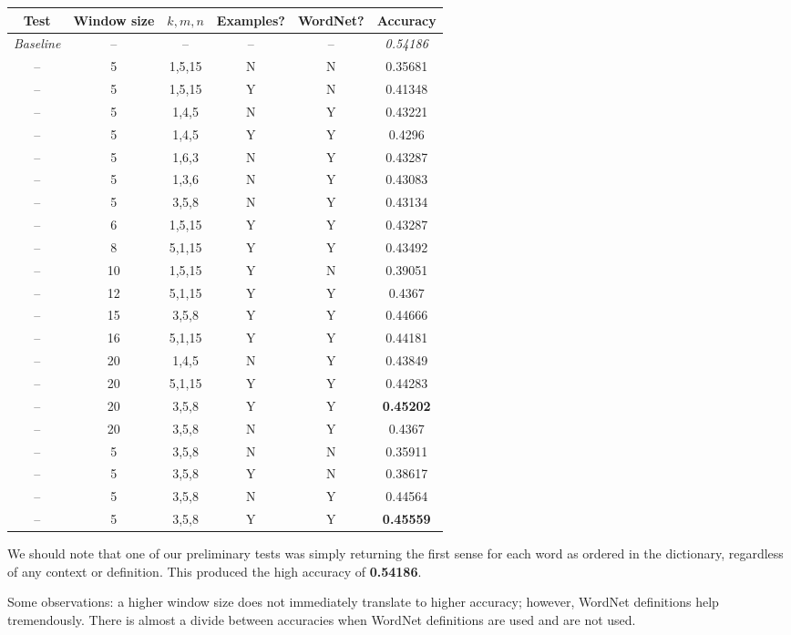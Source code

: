\documentclass{article}
\begin{document}
{\footnotesize\begin{tabular}{|c|c|c|c|c|c|}\hline
Test & Window size & $k,m,n$ & Examples? & WordNet? & Accuracy\\\hline
\textit{Baseline} & -- & -- & -- & -- & \textit{0.54186}\\
-- & 5 & 1,5,15 & N & N & 0.35681\\
-- & 5 & 1,5,15 & Y & N & 0.41348\\
-- & 5 & 1,4,5  & N & Y & 0.43221\\
-- & 5 & 1,4,5  & Y & Y & 0.4296\\
-- & 5 & 1,6,3  & N & Y & 0.43287\\
-- & 5 & 1,3,6  & N & Y & 0.43083\\
-- & 5 & 3,5,8  & N & Y & 0.43134\\
-- & 6 & 1,5,15 & Y & Y & 0.43287\\
-- & 8 & 5,1,15 & Y & Y & 0.43492\\
-- & 10 & 1,5,15 & Y & N & 0.39051\\
-- & 12 & 5,1,15 & Y & Y & 0.4367\\
-- & 15 & 3,5,8  & Y & Y & 0.44666\\
-- & 16 & 5,1,15 & Y & Y & 0.44181\\
-- & 20 & 1,4,5 & N & Y & 0.43849\\
-- & 20 & 5,1,15 & Y & Y & 0.44283\\
-- & 20 & 3,5,8  & Y & Y & \textbf{0.45202}\\
-- & 20 & 3,5,8  & N & Y & 0.4367\\\hline
-- & 5 & 3,5,8 & N & N & 0.35911\\
-- & 5 & 3,5,8 & Y & N & 0.38617\\
-- & 5 & 3,5,8 & N & Y & 0.44564\\
-- & 5 & 3,5,8 & Y & Y & \textbf{0.45559}\\\hline\end{tabular}}

We should note that one of our preliminary tests was simply returning the first sense for each word as ordered in the dictionary, regardless of any context or definition. This produced the high accuracy of \textbf{0.54186}.\par

Some observations: a higher window size does not immediately translate to higher accuracy; however, WordNet definitions help tremendously. There is almost a divide between accuracies when WordNet definitions are used and are not used.\par
\end{document}
